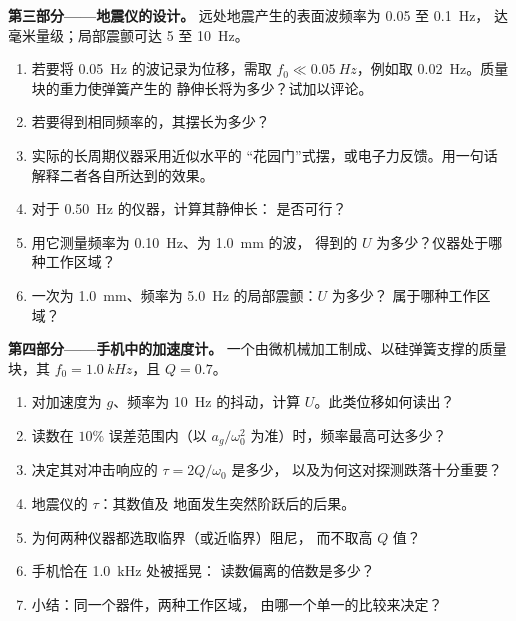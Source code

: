 \begin{problem}
\medskip
\noindent\textbf{第三部分——地震仪的设计。}
远处地震产生的表面波频率为 \qty{0.05}{} 至 \qty{0.1}{Hz}，
达毫米量级；局部震颤可达 \qty{5}{} 至 \qty{10}{Hz}。
\begin{enumerate}[resume]
  \item 若要将 \qty{0.05}{Hz} 的波记录为位移，需取
        $f_0 \ll \qty{0.05}{Hz}$，例如取 \qty{0.02}{Hz}。质量块的重力使弹簧产生的
        静伸长将为多少？试加以评论。
  \item 若要得到相同频率的，其摆长为多少？
  \item 实际的长周期仪器采用近似水平的
        “花园门”式摆，或电子力反馈。用一句话
        解释二者各自所达到的效果。
  \item 对于 \qty{0.50}{Hz} 的仪器，计算其静伸长：
        是否可行？
  \item 用它测量频率为 \qty{0.10}{Hz}、为 \qty{1.0}{mm} 的波，
        得到的 $U$ 为多少？仪器处于哪种工作区域？
  \item 一次为 \qty{1.0}{mm}、频率为 \qty{5.0}{Hz} 的局部震颤：$U$ 为多少？
        属于哪种工作区域？
\end{enumerate}

\medskip
\noindent\textbf{第四部分——手机中的加速度计。}
一个由微机械加工制成、以硅弹簧支撑的质量块，其 $f_0 = \qty{1.0}{kHz}$，且
$Q = 0.7$。
\begin{enumerate}[resume]
  \item 对加速度为 $g$、频率为 \qty{10}{Hz} 的抖动，计算
        $U$。此类位移如何读出？
  \item 读数在 $10\%$ 误差范围内（以 $a_g/\omega_0^2$ 为准）时，频率最高可达多少？
  \item 决定其对冲击响应的 $\tau = 2Q/\omega_0$ 是多少，
        以及为何这对探测跌落十分重要？
  \item 地震仪的 $\tau$：其数值及
        地面发生突然阶跃后的后果。
  \item 为何两种仪器都选取临界（或近临界）阻尼，
        而不取高 $Q$ 值？
  \item 手机恰在 \qty{1.0}{kHz} 处被摇晃：
        读数偏离的倍数是多少？
  \item 小结：同一个器件，两种工作区域，
        由哪一个单一的比较来决定？
\end{enumerate}
\end{problem}
